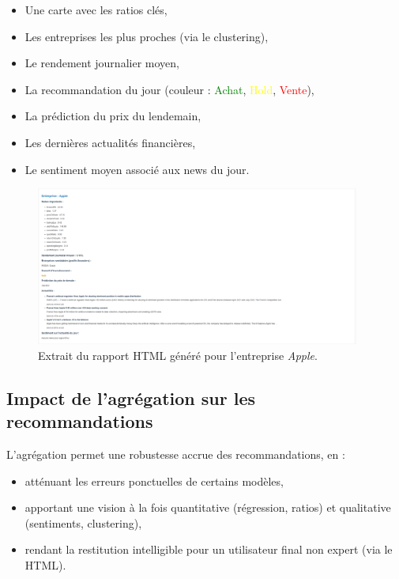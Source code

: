 \documentclass[a4paper,12pt]{article}
\begin{document}
\begin{itemize}
    \item Une carte avec les ratios clés,
    \item Les entreprises les plus proches (via le clustering),
    \item Le rendement journalier moyen,
    \item La recommandation du jour (couleur : \textcolor{green}{Achat}, \textcolor{yellow}{Hold}, \textcolor{red}{Vente}),
    \item La prédiction du prix du lendemain,
    \item Les dernières actualités financières,
    \item Le sentiment moyen associé aux news du jour.
\end{itemize}

\begin{figure}[h!]
    \centering
    \includegraphics[width=0.95\textwidth]{apple.png}
    \caption{Extrait du rapport HTML généré pour l’entreprise \textit{Apple}.}
    \label{fig:report_html}
\end{figure}

\subsection*{Impact de l’agrégation sur les recommandations}

L’agrégation permet une robustesse accrue des recommandations, en :
\begin{itemize}
    \item atténuant les erreurs ponctuelles de certains modèles,
    \item apportant une vision à la fois quantitative (régression, ratios) et qualitative (sentiments, clustering),
    \item rendant la restitution intelligible pour un utilisateur final non expert (via le HTML).
\end{itemize}
\end{document}
